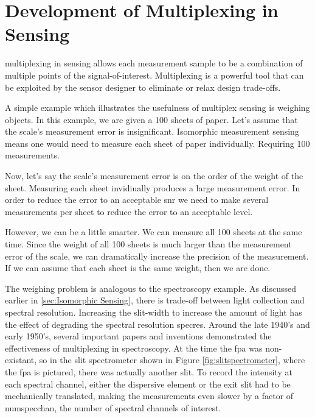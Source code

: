 \section{Development of Multiplexing in Sensing}\label{sec:multiplexInSensing}

\Gls{multiplexing} in sensing allows each measurement sample to be a combination of multiple points of the signal-of-interest.  Multiplexing is a powerful tool that can be exploited by the sensor designer to eliminate or relax design trade-offs. 

A simple example which illustrates the usefulness of multiplex sensing is weighing objects. In this example, we are given a 100 sheets of paper. Let's assume that the scale's measurement error is insignificant. Isomorphic measurement sensing means one would need to measure each sheet of paper individually. Requiring 100 measurements. 

Now, let's say the scale's measurement error is on the order of the weight of the sheet. Measuring each sheet invidiually produces a large measurement error. In order to reduce the error to an acceptable \gls{snr} we need to make several measurements per sheet to reduce the error to an acceptable level.

However, we can be a little smarter. We can measure all 100 sheets at the same time. Since the weight of all 100 sheets is much larger than the measurement error of the scale, we can dramatically increase the precision of the measurement. If we can assume that each sheet is the same weight, then we are done. 

The weighing problem is analogous to the spectroscopy example. As discussed earlier in \autoref{sec:Isomorphic Sensing}, there is trade-off between light collection and spectral resolution. Increasing the slit-width to increase the amount of light has the effect of degrading the spectral resolution \gls{specres}. Around the late 1940's and early 1950's, several important papers and inventions demonstrated the effectiveness of multiplexing in spectroscopy. At the time the \gls{fpa} was non-existant, so in the slit spectrometer shown in Figure \ref{fig:slitspectrometer}, where the \gls{fpa} is pictured, there was actually another slit. To record the intensity at each spectral channel, either the dispersive element or the exit slit had to be mechanically translated, making the measurements even slower by a factor of \gls{numspecchan}, the number of spectral channels of interest. 

